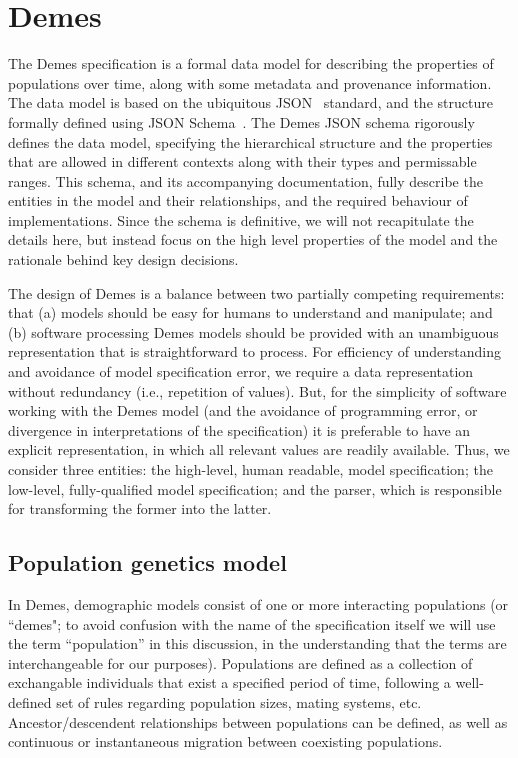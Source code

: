 \documentclass[11pt]{article}
\begin{document}
\section*{Demes}

The Demes specification is a formal data model for describing
the properties of populations over time,
along with some metadata and provenance information.
The data model is based on the ubiquitous JSON~\citep{bray2017javascript}
standard, and the structure formally defined using
JSON Schema~\citep{wright2020json}.
The Demes JSON schema rigorously defines the data model,
specifying the hierarchical structure and the properties that are allowed in different
contexts along with their types and permissable ranges. This schema, and its
accompanying documentation, fully describe the entities in the model and their
relationships, and the required behaviour of implementations. Since the
schema is definitive, we will not recapitulate the details
here, but instead focus on the high level properties of the model and
the rationale behind key design decisions.

The design of Demes is a balance between two partially competing requirements:
that (a) models should be easy for humans to understand and manipulate; and (b)
software processing Demes models should be provided with an unambiguous
representation that is straightforward to process. For efficiency of
understanding and avoidance of model specification error, we require a data
representation without redundancy (i.e., repetition of values). But, for the
simplicity of software working with the Demes model (and the avoidance of
programming error, or divergence in interpretations of the specification) it is
preferable to have an explicit representation, in which all relevant values are
readily available. Thus, we consider three entities: the high-level, human
readable, model specification; the low-level, fully-qualified model
specification; and the parser, which is responsible for transforming the former
into the latter.

\subsection*{Population genetics model}

In Demes, demographic models consist of one or more interacting populations (or
``demes"; to avoid confusion with the name of the specification itself we will
use the term ``population'' in this discussion, in the understanding that the
terms are interchangeable for our purposes). Populations are defined as a
collection of exchangable individuals that exist a specified period of time,
following a well-defined set of rules regarding population sizes, mating
systems, etc. Ancestor/descendent relationships between populations can be
defined, as well as continuous or instantaneous migration between coexisting
populations.
\end{document}

